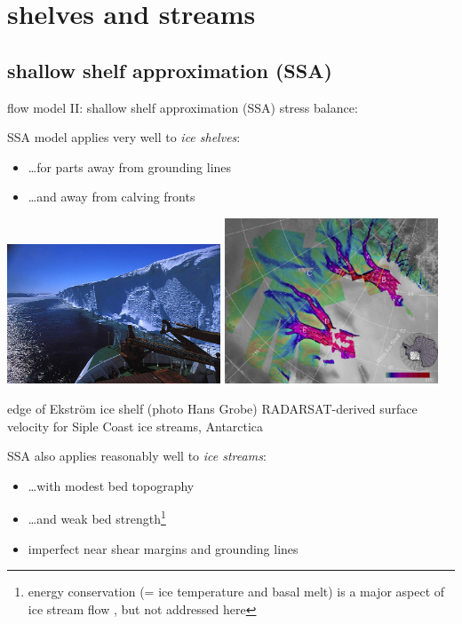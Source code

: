 \documentclass[titlepage,letterpaper,final,11pt]{scrartcl}
\newcommand{\alert}[1]{\emph{#1}}
\begin{document}
\section{shelves and streams}


\subsection{shallow shelf approximation (SSA)}

flow model II: shallow shelf approximation (SSA) stress balance:
  
SSA model applies very well to \alert{ice shelves}:
\begin{itemize}
\item \dots for parts away from grounding lines
\item \dots and away from calving fronts
\end{itemize}

\begin{center}
\includegraphics[width=2.5in]{ice_shelf_edge_hg}
\quad
\includegraphics[width=2.5in]{siple}

edge of Ekstr\"om ice shelf (photo Hans Grobe) \qquad RADARSAT-derived surface velocity for Siple Coast ice streams, Antarctica
\end{center}

SSA also applies reasonably well to \alert{ice streams}:
\begin{itemize}
\item \dots with modest bed topography
\item \dots and weak bed strength\footnote{energy conservation (= ice temperature and basal melt) is a major aspect of ice stream flow \cite{Raymondenergy}, but not addressed here}
\item imperfect near shear margins and grounding lines
\end{itemize}
\end{document}
